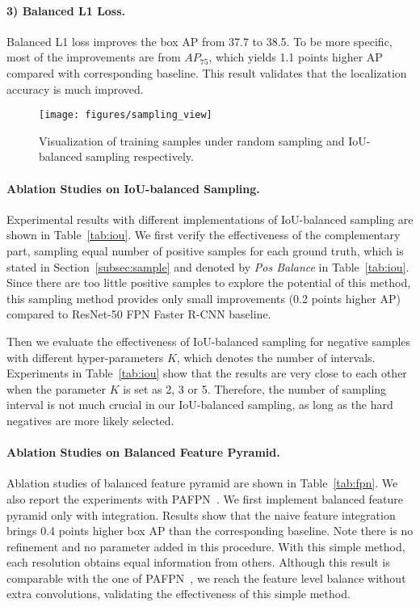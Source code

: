\documentclass[10pt,twocolumn,letterpaper]{article}
\begin{document}
\vspace{-12pt}
\paragraph{3) Balanced L1 Loss.}
Balanced L1 loss improves the box AP from 37.7 to 38.5.
To be more specific, most of the improvements are from $AP_{75}$, which yields 1.1 points higher AP compared with corresponding baseline.
This result validates that the localization accuracy is much improved.

\begin{figure}
	\centering
	\texttt{[image: figures/sampling\_view]}
	\caption{Visualization of training samples under random sampling and IoU-balanced sampling respectively.}
	\label{fig:sampling}
	\vspace{-10pt}
\end{figure}

\vspace{-12pt}
\paragraph{Ablation Studies on IoU-balanced Sampling.}
Experimental results with different implementations of IoU-balanced sampling are shown in Table~\ref{tab:iou}.
We first verify the effectiveness of the complementary part, \ie sampling equal number of positive samples for each ground truth, which is stated in Section~\ref{subsec:sample} and denoted by \emph{Pos Balance} in Table~\ref{tab:iou}.
Since there are too little positive samples to explore the potential of this method, this sampling method provides only small improvements (0.2 points higher AP) compared to ResNet-50 FPN Faster R-CNN baseline.

Then we evaluate the effectiveness of IoU-balanced sampling for negative samples with different hyper-parameters $K$, which denotes the number of intervals.
Experiments in Table~\ref{tab:iou} show that the results are very close to each other when the parameter $K$ is set as 2, 3 or 5.
Therefore, the number of sampling interval is not much crucial in our IoU-balanced sampling, as long as the hard negatives are more likely selected.

\vspace{-12pt}
\paragraph{Ablation Studies on Balanced Feature Pyramid.}
Ablation studies of balanced feature pyramid are shown in Table~\ref{tab:fpn}.
We also report the experiments with PAFPN~\cite{panet}.
We first implement balanced feature pyramid only with integration.
Results show that the naive feature integration brings 0.4 points higher box AP than the corresponding baseline.
Note there is no refinement and no parameter added in this procedure.
With this simple method, each resolution obtains equal information from others.
Although this result is comparable with the one of PAFPN~\cite{panet}, we reach the feature level balance without extra convolutions, validating the effectiveness of this simple method.
\end{document}
